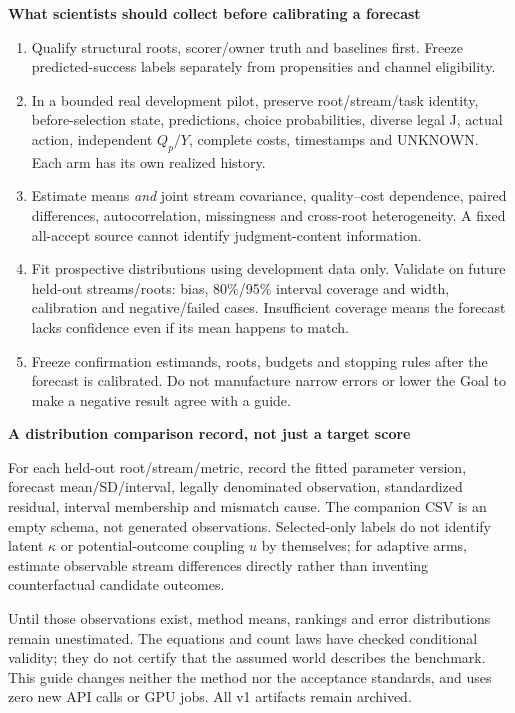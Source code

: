 \documentclass[10pt,a4paper]{article}
\newcommand{\lead}[1]{\vspace{3pt}\textbf{#1}\par}
\begin{document}
\lead{What scientists should collect before calibrating a forecast}
\begin{enumerate}\setlength{\itemsep}{2pt}
\item Qualify structural roots, scorer/owner truth and baselines first. Freeze
  predicted-success labels separately from propensities and channel eligibility.
\item In a bounded real development pilot, preserve root/stream/task identity,
  before-selection state, predictions, choice probabilities, diverse legal J,
  actual action, independent $Q_p/Y$, complete costs, timestamps and UNKNOWN.
  Each arm has its own realized history.
\item Estimate means \emph{and} joint stream covariance, quality--cost dependence,
  paired differences, autocorrelation, missingness and cross-root heterogeneity.
  A fixed all-accept source cannot identify judgment-content information.
\item Fit prospective distributions using development data only. Validate on
  future held-out streams/roots: bias, 80\%/95\% interval coverage and width,
  calibration and negative/failed cases. Insufficient coverage means the forecast
  lacks confidence even if its mean happens to match.
\item Freeze confirmation estimands, roots, budgets and stopping rules after the
  forecast is calibrated. Do not manufacture narrow errors or lower the Goal
  to make a negative result agree with a guide.
\end{enumerate}
\lead{A distribution comparison record, not just a target score}
For each held-out root/stream/metric, record the fitted parameter version,
forecast mean/SD/interval, legally denominated observation, standardized residual,
interval membership and mismatch cause. The companion CSV is an empty schema,
not generated observations. Selected-only labels do not identify latent
$\kappa$ or potential-outcome coupling $u$ by themselves; for adaptive arms,
estimate observable stream differences directly rather than inventing
counterfactual candidate outcomes.

Until those observations exist, method means, rankings and error distributions
remain unestimated. The equations and count laws have checked conditional
validity; they do not certify that the assumed world describes the benchmark.
This guide changes neither the method nor the acceptance standards, and uses
zero new API calls or GPU jobs. All v1 artifacts remain archived.
\end{document}
